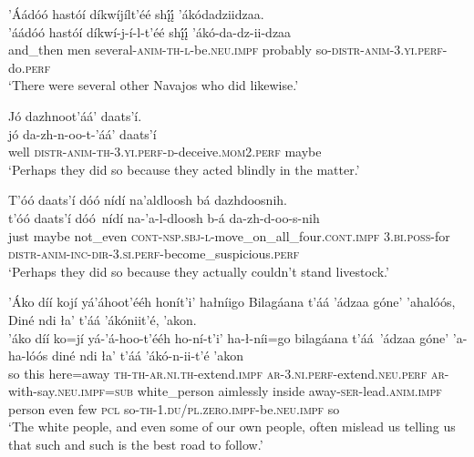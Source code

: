 \ea\label{ex:text7-10-10}
’Áádóó hastóí díkwíjílt’éé shį́į́ ’ákódadziidzaa.\\
\gll ’áádóó	hastóí	díkwí-j-í-l-t’éé	shį́į́	’ákó-da-dz-ii-dzaa\\
     and\_then	men	several-\textsc{anim}-\textsc{th}-\textsc{l}-be.\textsc{neu}.\textsc{impf}	probably	so-\textsc{distr}-\textsc{anim}-3.\textsc{yi}.\textsc{perf}-do.\textsc{perf}\\
\glt `There were several other Navajos who did likewise.'
\z

\ea\label{ex:text7-10-11}
Jó dazhnoot’áá’ daats’í.\\
\gll jó	da-zh-n-oo-t-’áá’	daats’í\\
     well	\textsc{distr}-\textsc{anim}-\textsc{th}-3.\textsc{yi}.\textsc{perf}-\textsc{d}-deceive.\textsc{mom}2.\textsc{perf}	maybe\\
\glt `Perhaps they did so because they acted blindly in the matter.'
\z

\ea\label{ex:text7-10-12}
T’óó daats’í dóó nídí na’aldloosh bá dazhdoosnih.\\
\gll t’óó	daats’í	dóó~{nídí}	na-’a-l-dloosh	b-á	da-zh-d-oo-s-nih\\
     just	maybe	not\_even	\textsc{cont}-\textsc{nsp}.\textsc{sbj}-\textsc{l}-move\_on\_all\_four.\textsc{cont}.\textsc{impf}	3.\textsc{bi}.\textsc{poss}-for	\textsc{distr}-\textsc{anim}-\textsc{inc}-\textsc{dir}-3.\textsc{si}.\textsc{perf}-become\_suspicious.\textsc{perf}\\
\glt `Perhaps they did so because they actually couldn't stand livestock.'
\z

\ea\label{ex:text7-10-13}
’Áko díí kojí yá’áhoot’ééh honít’i’ hałníigo Bilagáana t’áá ’ádzaa góne’ ’ahalóós, Diné ndi ła’ t’áá ’ákóniit’é, ’akon.\\
\gll ’áko	díí	ko=jí	yá-’á-hoo-t’ééh	ho-ní-t’i’	ha-ł-níi=go	bilagáana	t’áá~{’ádzaa}	góne’	’a-ha-lóós	diné	ndi	ła’	t’áá	’ákó-n-ii-t’é	’akon\\
     so	this	here=away	\textsc{th}-\textsc{th}-\textsc{ar}.\textsc{ni}.\textsc{th}-extend.\textsc{impf}	\textsc{ar}-3.\textsc{ni}.\textsc{perf}-extend.\textsc{neu}.\textsc{perf}	\textsc{ar}-with-say.\textsc{neu}.\textsc{impf}=\textsc{sub}	white\_person	aimlessly	inside	away-\textsc{ser}-lead.\textsc{anim}.\textsc{impf}	person	even	few	\textsc{pcl}	so-\textsc{th}-1.\textsc{du}/\textsc{pl}.\textsc{zero}.\textsc{impf}-be.\textsc{neu}.\textsc{impf}	so\\
\glt `The white people, and even some of our own people, often mislead us telling us that such and such is the best road to follow.'
\z

